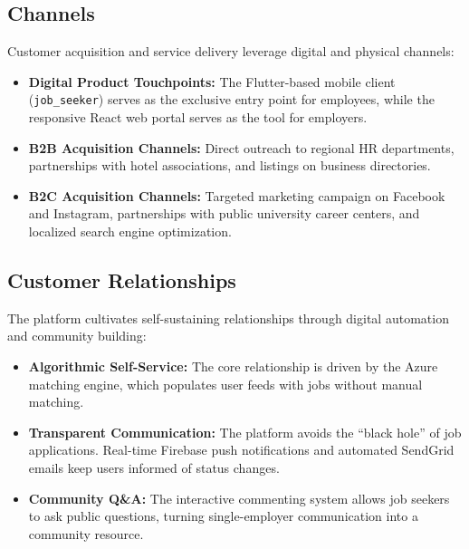 \documentclass[12pt, a4paper]{report}
\begin{document}
\subsection{Channels}
Customer acquisition and service delivery leverage digital and physical channels:
\begin{itemize}
    \item \textbf{Digital Product Touchpoints:} The Flutter-based mobile client (\texttt{job\_seeker}) serves as the exclusive entry point for employees, while the responsive React web portal serves as the tool for employers.
    \item \textbf{B2B Acquisition Channels:} Direct outreach to regional HR departments, partnerships with hotel associations, and listings on business directories.
    \item \textbf{B2C Acquisition Channels:} Targeted marketing campaign on Facebook and Instagram, partnerships with public university career centers, and localized search engine optimization.
\end{itemize}

\subsection{Customer Relationships}
The platform cultivates self-sustaining relationships through digital automation and community building:
\begin{itemize}
    \item \textbf{Algorithmic Self-Service:} The core relationship is driven by the Azure matching engine, which populates user feeds with jobs without manual matching.
    \item \textbf{Transparent Communication:} The platform avoids the ``black hole'' of job applications. Real-time Firebase push notifications and automated SendGrid emails keep users informed of status changes.
    \item \textbf{Community Q\&A:} The interactive commenting system allows job seekers to ask public questions, turning single-employer communication into a community resource.
\end{itemize}
\end{document}
